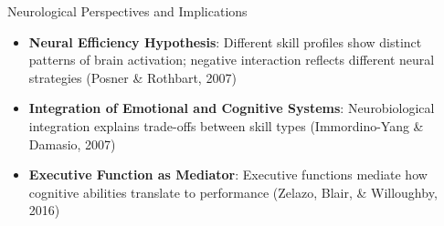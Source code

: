 \documentclass{beamer}
\begin{document}
\begin{frame}{Neurological Perspectives and Implications}
    \begin{itemize}
        \item \textbf{Neural Efficiency Hypothesis}: Different skill profiles show distinct patterns of brain activation; negative interaction reflects different neural strategies (Posner \& Rothbart, 2007)
        \item \textbf{Integration of Emotional and Cognitive Systems}: Neurobiological integration explains trade-offs between skill types (Immordino-Yang \& Damasio, 2007)
        \item \textbf{Executive Function as Mediator}: Executive functions mediate how cognitive abilities translate to performance (Zelazo, Blair, \& Willoughby, 2016)
    \end{itemize}
\end{frame}
\end{document}
